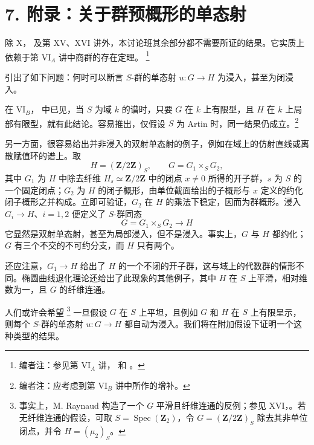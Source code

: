 
\setcounter{footnote}{31}
\section*{7. 附录：关于群预概形的单态射}

除 X， 及第 XV、XVI 讲外，本讨论班其余部分都不需要所证的结果。它实质上依赖于第 VI\(_A\) 讲中商群的存在定理。
\footnote{编者注：参见第 VI\(_A\) 讲， 和 。}

 引出了如下问题：何时可以断言 \(S\)-群的单态射 \(u:G\to H\) 为浸入，甚至为闭浸入。

在 VI\(_B\)， 中已见，当 \(S\) 为域 \(k\) 的谱时，只要 \(G\) 在 \(k\) 上有限型，且 \(H\) 在 \(k\) 上局部有限型，就有此结论。容易推出，仅假设 \(S\) 为 Artin 时，同一结果仍成立。\footnote{编者注：应考虑到第 VI\(_B\) 讲中所作的增补。}

另一方面，很容易给出并非浸入的双射单态射的例子，例如在域上的仿射直线或离散赋值环的谱上。取
\[
  H=(\mathbf Z/2\mathbf Z)_S,\qquad G=G_1\times_SG_2,
\]
其中 \(G_1\) 为 \(H\) 中除去纤维 \(H_s\simeq\mathbf Z/2\mathbf Z\) 中的闭点 \(x\ne0\) 所得的开子群，\(s\) 为 \(S\) 的一个固定闭点；\(G_2\) 为 \(H\) 的闭子概形，由单位截面给出的子概形与 \(x\) 定义的约化闭子概形之并构成。立即可验证，\(G_2\) 在 \(H\) 的乘法下稳定，因而为群概形。浸入 \(G_i\to H\)、\(i=1,2\) 便定义了 \(S\)-群同态
\[
  G=G_1\times_SG_2\longrightarrow H
\]
它显然是双射单态射，甚至为局部浸入，但不是浸入。事实上，\(G\) 与 \(H\) 都约化；\(G\) 有三个不交的不可约分支，而 \(H\) 只有两个。

还应注意，\(G_1\to H\) 给出了 \(H\) 的一个不闭的开子群，这与域上的代数群的情形不同。椭圆曲线退化理论还给出了此现象的其他例子，其中 \(H\) 在 \(S\) 上平滑，相对维数为一，且 \(G\) 的纤维连通。

人们或许会希望\begingroup
\renewcommand{\thefootnote}{(\(\ast\))}%
\footnote[1]{事实上，M. Raynaud 构造了一个 \(G\) 平滑且纤维连通的反例；参见 XVI，。若无纤维连通的假设，可取 \(S=\operatorname{Spec}(\mathbf Z_2)\)，令 \(G=(\mathbf Z/2\mathbf Z)_S\) 除去其非单位闭点，并令 \(H=(\mu_2)_S\)。}%
\endgroup
一旦假设 \(G\) 在 \(S\) 上平坦，且例如 \(G\) 和 \(H\) 在 \(S\) 上有限呈示，则每个 \(S\)-群的单态射 \(u:G\to H\) 都自动为浸入。我们将在附加假设下证明一个这种类型的结果。

